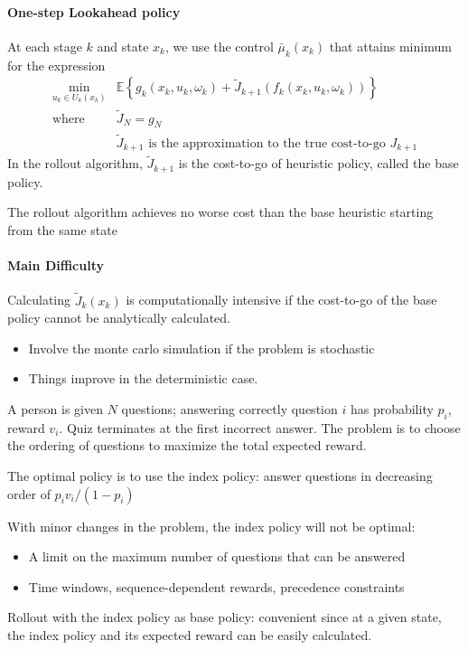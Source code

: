 \paragraph{One-step Lookahead policy}
At each stage $k$ and state $x_k$, we use the control $\bar{\mu}_k(x_k)$ that attains minimum for the expression
\[
\begin{array}{ll}
\min_{u_k\in U_k(x_k)}&\mathbb{E}\left\{
g_k(x_k,u_k,\omega_k)
+
\tilde{J}_{k+1}(f_k(x_k,u_k,\omega_k))
\right\}\\
\text{where}&\tilde{J}_N=g_N\\
&\tilde{J}_{k+1}\text{ is the approximation to the true cost-to-go $J_{k+1}$}
\end{array}
\]
In the rollout algorithm, $\tilde{J}_{k+1}$ is the cost-to-go of heuristic policy, called the base policy.
\begin{proposition}\label{pro:5:4}
The rollout algorithm achieves no worse cost than the base heuristic starting from the same state
\end{proposition}

\paragraph{Main Difficulty}
Calculating $\tilde{J}_k(x_k)$ is computationally intensive if the cost-to-go of the base policy cannot be analytically calculated.
\begin{itemize}
\item
Involve the monte carlo simulation if the problem is stochastic
\item
Things improve in the deterministic case.
\end{itemize}

\begin{example}
A person is given $N$ questions; answering correctly question $i$ has probability $p_i$, reward $v_i$. Quiz terminates at the first incorrect answer.
The problem is to choose the ordering of questions to maximize the total expected reward.

The optimal policy is to use the index policy: answer questions in decreasing order of $p_iv_i/(1-p_i)$

With minor changes in the problem, the index policy will not be optimal:
\begin{itemize}
\item
A limit on the maximum number of questions that can be answered
\item
Time windows, sequence-dependent rewards, precedence constraints
\end{itemize}

Rollout with the index policy as base policy:
convenient since at a given state, the index policy and its expected reward can be easily calculated.
\end{example}

